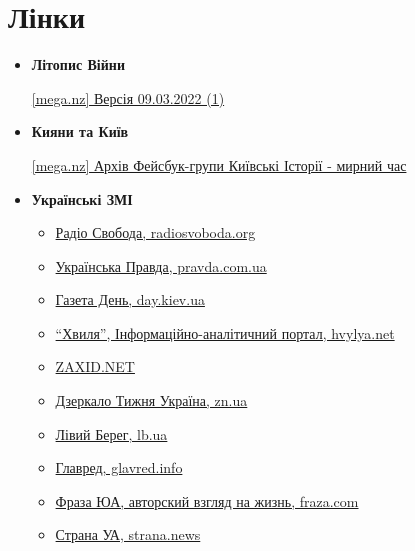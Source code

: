  
 
 
 
 
\section{Лінки}
\label{sec:topics.vojna.linky}

\begin{itemize}
\item \textbf{Літопис Війни}

\href{https://mega.nz/file/08E1QARZ#lptMoRBsXDBuR_CLQ98Wr44fUBqcVqFDVfKB6FTzgw0}{%
[mega.nz] Версія 09.03.2022 (1)%
}

\item \textbf{Кияни та Київ}


\href{https://mega.nz/file/cltlFCgB#u_J6kOL2TxaLoKgXPKJdYTNpA7-PMcwKicPydJ3P-zk}{%
[mega.nz] Архів Фейсбук-групи Київські Історії - мирний час}

\item \textbf{Українські ЗМІ}

\begin{itemize}
\item \href{https://www.radiosvoboda.org}{Радіо Свобода, radiosvoboda.org}
\item \href{https://www.pravda.com.ua}{Українська Правда, pravda.com.ua}
\item \href{https://www.day.kiev.ua}{Газета День, day.kiev.ua}
\item \href{https://hvylya.net}{\enquote{Хвиля}, Інформаційно-аналітичний портал, hvylya.net}
\item \href{https://zaxid.net}{ZAXID.NET}
\item \href{https://zn.ua}{Дзеркало Тижня Україна, zn.ua}
\item \href{https://zn.ua}{Лівий Берег, lb.ua}
\item \href{https://glavred.info}{Главред, glavred.info}
\item \href{https://fraza.com}{Фраза ЮА, авторский взгляд на жизнь, fraza.com}
\item \href{https://strana.news}{Страна УА, strana.news}
\end{itemize}


\end{itemize}
